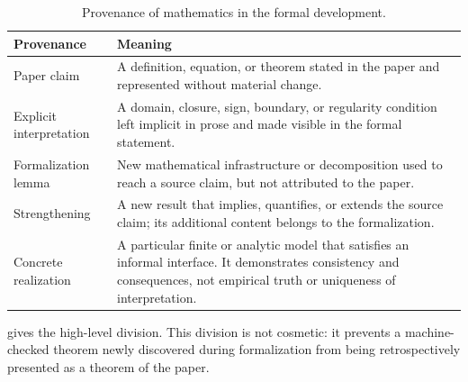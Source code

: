 \documentclass[11pt,a4paper]{article}
\begin{document}
\begin{table}[htbp]
\centering
\caption{Provenance of mathematics in the formal development.}
\label{tab:provenance}
\begin{tabularx}{\linewidth}{@{}L{32mm}Y@{}}
\toprule
\textbf{Provenance} & \textbf{Meaning} \\
\midrule
Paper claim & A definition, equation, or theorem stated in the paper and
represented without material change. \\
Explicit interpretation & A domain, closure, sign, boundary, or regularity
condition left implicit in prose and made visible in the formal statement. \\
Formalization lemma & New mathematical infrastructure or decomposition used
to reach a source claim, but not attributed to the paper. \\
Strengthening & A new result that implies, quantifies, or extends the source
claim; its additional content belongs to the formalization. \\
Concrete realization & A particular finite or analytic model that satisfies
an informal interface. It demonstrates consistency and consequences, not
empirical truth or uniqueness of interpretation. \\
\bottomrule
\end{tabularx}
\end{table}

 gives the high-level division. This division is not
cosmetic: it prevents a machine-checked theorem newly discovered during
formalization from being retrospectively presented as a theorem of the paper.
\end{document}
